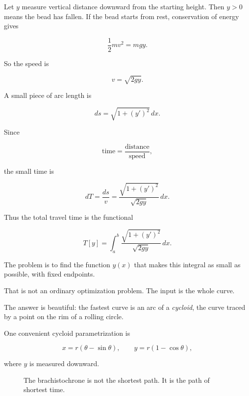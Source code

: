 Let \(y\) measure vertical distance downward from the starting height.  Then \(y>0\)
means the bead has fallen.  If the bead starts from rest, conservation of energy gives

\[
\frac12mv^2=mgy.
\]

So the speed is

\[
v=\sqrt{2gy}.
\]

A small piece of arc length is

\[
ds=\sqrt{1+(y')^2}\,dx.
\]

Since

\[
\text{time}=\frac{\text{distance}}{\text{speed}},
\]

the small time is

\[
dT=\frac{ds}{v}
=
\frac{\sqrt{1+(y')^2}}{\sqrt{2gy}}\,dx.
\]

Thus the total travel time is the functional

\[
\boxed{
T[y]
=
\int_a^b
\frac{\sqrt{1+(y')^2}}{\sqrt{2gy}}\,dx.
}
\]

The problem is to find the function \(y(x)\) that makes this integral as small as possible,
with fixed endpoints.

That is not an ordinary optimization problem.  The input is the whole curve.

The answer is beautiful: the fastest curve is an arc of a \emph{cycloid}, the curve traced
by a point on the rim of a rolling circle.

One convenient cycloid parametrization is

\[
x=r(\theta-\sin\theta),
\qquad
y=r(1-\cos\theta),
\]

where \(y\) is measured downward.

\begin{figure}[h]
\centering
{}
\caption{The brachistochrone is not the shortest path.  It is the path of shortest time.}
\label{fig:brachistochrone-cycloid}
\end{figure}


